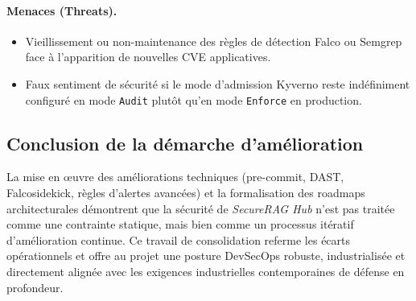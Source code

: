 \paragraph{Menaces (Threats).}
\begin{itemize}
  \item Vieillissement ou non-maintenance des règles de détection Falco ou Semgrep face à l'apparition de nouvelles CVE applicatives.
  \item Faux sentiment de sécurité si le mode d'admission Kyverno reste indéfiniment configuré en mode \texttt{Audit} plutôt qu'en mode \texttt{Enforce} en production.
\end{itemize}

\subsection{Conclusion de la démarche d'amélioration}
\label{subsec:conclusion-ameliorations}

La mise en œuvre des améliorations techniques (pre-commit, DAST, Falcosidekick, règles d'alertes avancées) et la formalisation des roadmaps architecturales démontrent que la sécurité de \textit{SecureRAG Hub} n'est pas traitée comme une contrainte statique, mais bien comme un processus itératif d'amélioration continue. Ce travail de consolidation referme les écarts opérationnels et offre au projet une posture DevSecOps robuste, industrialisée et directement alignée avec les exigences industrielles contemporaines de défense en profondeur.
